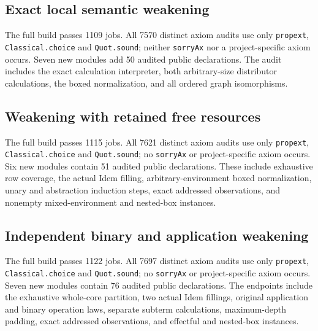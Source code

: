 \subsection{Exact local semantic weakening}
{\raggedright
The full build passes 1109 jobs. All 7570 distinct axiom audits use only
\texttt{propext}, \texttt{Classical.choice} and \texttt{Quot.sound}; neither
\texttt{sorryAx} nor a project-specific axiom occurs. Seven new modules add
50 audited public declarations. The audit includes the exact calculation
interpreter, both arbitrary-size distributor calculations, the boxed
normalization, and all ordered graph isomorphisms.\par}

\subsection{Weakening with retained free resources}
{\raggedright
The full build passes 1115 jobs. All 7621 distinct axiom audits use only
\texttt{propext}, \texttt{Classical.choice} and \texttt{Quot.sound}; no
\texttt{sorryAx} or project-specific axiom occurs. Six new modules contain
51 audited public declarations. These include exhaustive row coverage,
the actual Idem filling, arbitrary-environment boxed normalization, unary
and abstraction induction steps, exact addressed observations, and
nonempty mixed-environment and nested-box instances.\par}


\subsection{Independent binary and application weakening}
{\raggedright
The full build passes 1122 jobs. All 7697 distinct axiom audits use only
\texttt{propext}, \texttt{Classical.choice} and \texttt{Quot.sound}; no
\texttt{sorryAx} or project-specific axiom occurs. Seven new modules contain
76 audited public declarations. The endpoints include the exhaustive
whole-core partition, two actual Idem fillings, original application and
binary operation laws, separate subterm calculations, maximum-depth padding,
exact addressed observations, and effectful and nested-box instances.\par}


